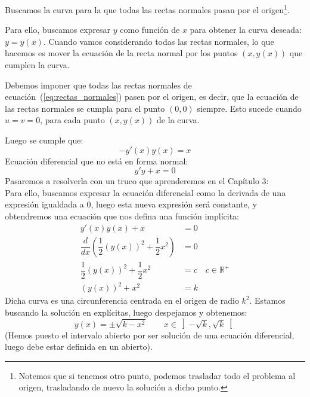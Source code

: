 \begin{ejemplo}
    Buscamos la curva para la que todas las rectas normales pasan por el origen\footnote{Notemos que si tenemos otro punto, podemos trasladar todo el problema al origen, trasladando de nuevo la solución a dicho punto.}.

    Para ello, buscamos expresar $y$ como función de $x$ para obtener la curva deseada: $y=y(x)$. Cuando vamos considerando todas las rectas normales, lo que hacemos es mover la ecuación de la recta normal por los puntos $(x,y(x))$ que cumplen la curva. 

    Debemos imponer que todas las rectas normales de ecuación~(\ref{eq:rectas_normales}) pasen por el origen, es decir, que la ecuación de las rectas normales se cumpla para el punto $(0,0)$ siempre. Esto sucede cuando $u=v=0$, para cada punto $(x,y(x))$ de la curva.

Luego se cumple que:
\begin{equation*}
    -y'(x)y(x) = x
\end{equation*}
Ecuación diferencial que no está en forma normal:
\begin{equation*}
    y'y+x=0
\end{equation*}
Pasaremos a resolverla con un truco que aprenderemos en el Capítulo 3:\\

Para ello, buscamos expresar la ecuación diferencial como la derivada de una expresión igualdada a 0, luego esta nueva expresión será constante, y obtendremos una ecuación que nos defina una función implícita:
\begin{align*}
    y'(x)y(x) + x &= 0 \\
    \dfrac{d}{dx}\left(\dfrac{1}{2}{(y(x))}^{2}+\dfrac{1}{2}x^2\right)&= 0 \\
    \dfrac{1}{2}{\left(y(x)\right)}^{2}+\dfrac{1}{2}x^2&=c \quad c\in \mathbb{R}^+\\
    {\left(y(x)\right)}^{2}+x^2 &= k
\end{align*}
Dicha curva es una circunferencia centrada en el origen de radio $k^2$. Estamos buscando la solución en explícitas, luego despejamos y obtenemos:
\begin{equation*}
    y(x) = \pm \sqrt{k-x^2} \qquad x\in \left]-\sqrt{k},\sqrt{k}\right[
\end{equation*}
(Hemos puesto el intervalo abierto por ser solución de una ecuación diferencial, luego debe estar definida en un abierto).
\end{ejemplo}


